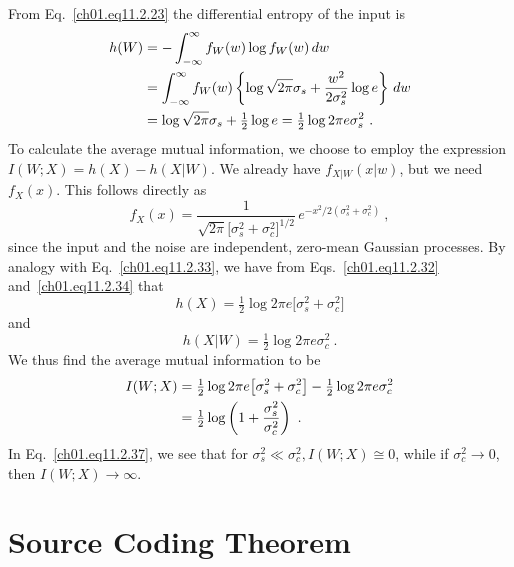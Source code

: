 \begin{example}
\noindent
From Eq.~\eqref{ch01.eq11.2.23} the differential entropy of the input is
\begin{align}
 h(W) & = - \int^\infty_{-\infty} f_W(w) \log f_W (w)\,dw
\notag\\
 & =  \int^\infty_{-\infty} f_W(w)
 \left\{ \log \sqrt{2\pi} \sigma_s +
 \frac{w^2}{2\sigma^2_s} \log e \right\}\,dw
\notag\\
 &= \log  \sqrt{2\pi} \sigma_s +\tfrac{1}{2} \log e =
 \tfrac{1}{2} \log 2 \pi e \sigma^2_s~.
\label{ch01.eq11.2.33}
\end{align}
To calculate the average mutual information, we choose to employ the
expression
$I(W;X) = h(X) - h(X|W)$. We already have $f_{X|W} (x|w)$, but we need
$f_X (x)$. This follows directly as
\begin{equation}
 f_X(x) = \frac{1}
 { \sqrt{2\pi} \big[ \sigma^2_s +\sigma^2_c \big]^{1/2} }
 \, e^{-x^2/2(\sigma^2_s + \sigma^2_c )}~,
\label{ch01.eq11.2.34}
\end{equation}
since the input and the noise are independent, zero-mean Gaussian processes.
By analogy with Eq.~\eqref{ch01.eq11.2.33}, we have from
Eqs.~\eqref{ch01.eq11.2.32} and~\eqref{ch01.eq11.2.34} that
\begin{equation}
 h(X) = \tfrac{1}{2} \log 2 \pi e \big[\sigma^2_s+ \sigma^2_c\big]
\label{ch01eq.11.2.35}
\end{equation}
and
\begin{equation}
 h(X|W) = \tfrac{1}{2} \log 2 \pi e \sigma^2_c~.
\label{ch01.eq11.2.36}
\end{equation}
We thus find the average mutual information to be
\begin{align}
 I(W;X) & = \tfrac{1}{2} \log 2 \pi e \big[\sigma^2_s+\sigma^2_c \big]
  - \tfrac{1}{2} \log 2 \pi e \sigma ^2_c
\notag\\
 & = \tfrac{1}{2} \log \left( 1+ \frac{\sigma^2_s}{\sigma^2_c}\right)~.
\label{ch01.eq11.2.37}
\end{align}
In Eq.~\eqref{ch01.eq11.2.37}, we see that for
$\sigma^2_s \ll \sigma^2_c , I(W;X) \cong 0 $, while if
$\sigma^2_c \rightarrow 0$, then $I(W;X) \rightarrow \infty $.
\end{example}


\section{Source Coding Theorem}
\label{ch01.sec11.3}

